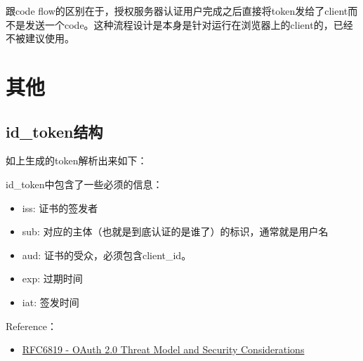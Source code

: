 \documentclass[12pt]{article}
\begin{document}
跟code flow的区别在于，授权服务器认证用户完成之后直接将token发给了client而不是发送一个code。这种流程设计是本身是针对运行在浏览器上的client的，已经不被建议使用。

\section{其他}\label{ux5176ux4ed6}

\subsection{id\_token结构}\label{id_tokenux7ed3ux6784}

如上生成的token解析出来如下：

\begin{Shaded}
\begin{Highlighting}[]
\FunctionTok{\{}
  \FunctionTok{:} \FunctionTok{,}
  \FunctionTok{:} \FunctionTok{,}
  \FunctionTok{:} \FunctionTok{,}
  \FunctionTok{:} \FunctionTok{,}
  \FunctionTok{:} \FunctionTok{,}
  \FunctionTok{:} \FunctionTok{,}
  \FunctionTok{:} \FunctionTok{,}
  \FunctionTok{:} \OtherTok{[}
  \OtherTok{]}
\FunctionTok{\}}
\end{Highlighting}
\end{Shaded}

id\_token中包含了一些必须的信息：

\begin{itemize}
\tightlist
\item
  iss: 证书的签发者
\item
  sub: 对应的主体（也就是到底认证的是谁了）的标识，通常就是用户名
\item
  aud: 证书的受众，必须包含client\_id。
\item
  exp: 过期时间
\item
  iat: 签发时间
\end{itemize}

Reference：

\begin{itemize}
\tightlist
\item
  \href{https://tools.ietf.org/html/rfc6819}{RFC6819 - OAuth 2.0 Threat Model and Security Considerations}
\end{itemize}
\end{document}
